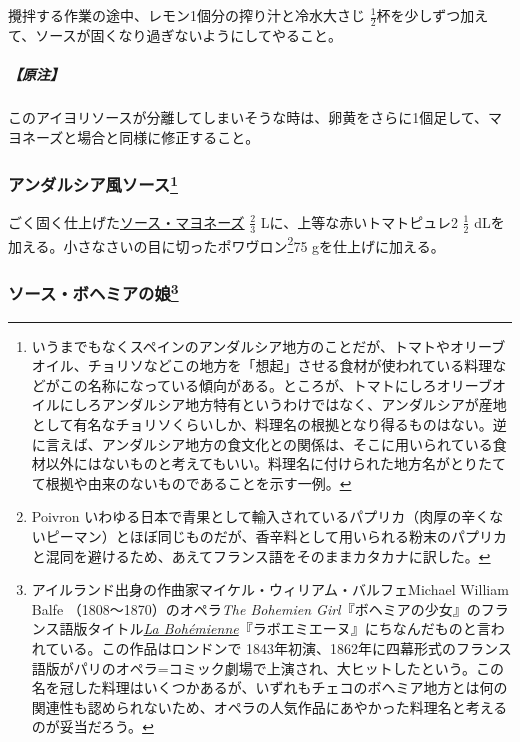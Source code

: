 \begin{recette}
攪拌する作業の途中、レモン1個分の搾り汁と冷水大さじ
\(\frac{1}{2}\)杯を少しずつ加えて、ソースが固くなり過ぎないようにしてやること。

\hypertarget{nota-sauce-aioli}{%
\subparagraph{【原注】}\label{nota-sauce-aioli}}

このアイヨリソースが分離してしまいそうな時は、卵黄をさらに1個足して、マヨネーズと場合と同様に修正すること。

\atoaki{}

\hypertarget{sauce-andalouse}{%
\subsubsection[アンダルシア風ソース]{\texorpdfstring{アンダルシア風ソース\footnote{いうまでもなくスペインのアンダルシア地方のことだが、トマトやオリーブオイル、チョリソなどこの地方を「想起」させる食材が使われている料理などがこの名称になっている傾向がある。ところが、トマトにしろオリーブオイルにしろアンダルシア地方特有というわけではなく、アンダルシアが産地として有名なチョリソくらいしか、料理名の根拠となり得るものはない。逆に言えば、アンダルシア地方の食文化との関係は、そこに用いられている食材以外にはないものと考えてもいい。料理名に付けられた地方名がとりたてて根拠や由来のないものであることを示す一例。}}{アンダルシア風ソース}}\label{sauce-andalouse}}



ごく固く仕上げた\protect\hyperlink{mayonnaise}{ソース・マヨネーズ}
\(\frac{2}{3}\) Lに、上等な赤いトマトピュレ2 \(\frac{1}{2}\)
dLを加える。小さなさいの目に切ったポワヴロン\footnote{Poivron
  いわゆる日本で青果として輸入されているパプリカ（肉厚の辛くないピーマン）とほぼ同じものだが、香辛料として用いられる粉末のパプリカと混同を避けるため、あえてフランス語をそのままカタカナに訳した。}75
gを仕上げに加える。

\atoaki{}

\hypertarget{sauce-bohemienne}{%
\subsubsection[ソース・ボヘミアの娘]{\texorpdfstring{ソース・ボヘミアの娘\footnote{アイルランド出身の作曲家マイケル・ウィリアム・バルフェMichael
  William Balfe （1808〜1870）のオペラ\emph{The Bohemien
  Girl}『ボヘミアの少女』のフランス語版タイトル\href{https://archive.org/details/labohmiennegrand00balf}{\emph{La
  Bohémienne}}『ラボエミエーヌ』にちなんだものと言われている。この作品はロンドンで
  1843年初演、1862年に四幕形式のフランス語版がパリのオペラ=コミック劇場で上演され、大ヒットしたという。この名を冠した料理はいくつかあるが、いずれもチェコのボヘミア地方とは何の関連性も認められないため、オペラの人気作品にあやかった料理名と考えるのが妥当だろう。}}{ソース・ボヘミアの娘}}\label{sauce-bohemienne}}


\end{recette}

